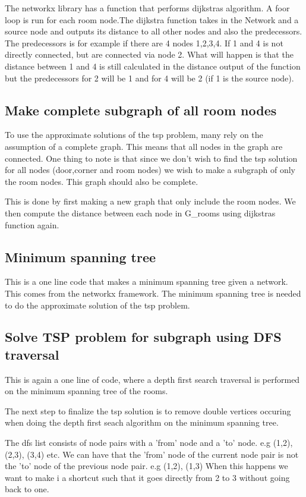 The networkx library has a function that performs dijkstras algorithm. A foor loop is run for each room node.The dijkstra function takes in the Network and a source node and outputs its distance to all other nodes and also the predecessors. The predecessors is for example if there are 4 nodes 1,2,3,4. If 1 and 4 is not directly connected, but are connected via node 2. What will happen is that the distance between 1 and 4 is still calculated in the distance output of the function but the predecessors for 2 will be 1 and for 4 will be 2 (if 1 is the source node).


\subsection{Make complete subgraph of all room nodes}
To use the approximate solutions of the tsp problem, many rely on the assumption of a complete graph. This means that all nodes in the graph are connected. One thing to note is that since we don't wish to find the tsp solution for all nodes (door,corner and room nodes) we wish to make a subgraph of only the room nodes. This graph should also be complete. 

This is done by first making a new graph that only include the room nodes.
We then compute the distance between each node in G_rooms using dijkstras function again.



\subsection{Minimum spanning tree}
This is a one line code that makes a minimum spanning tree given a network. This comes from the networkx framework. 
The minimum spanning tree is needed to do the approximate solution of the tsp problem.


\subsection{Solve TSP problem for subgraph using DFS traversal}
This is again a one line of code, where a depth first search traversal is performed on the minimum spanning tree of the rooms. 

The next step to finalize the tsp solution is to remove double vertices occuring when doing the depth first seach algorithm on the minimum spanning tree.

The dfs list consists of node pairs with a 'from' node and a 'to' node.
e.g
(1,2), (2,3), (3,4) etc.
We can have that the 'from' node of the current node pair is not the 'to' node of the previous node pair. 
e.g
(1,2), (1,3)
When this happens we want to make i a shortcut such that it goes directly from 2 to 3 without going back to one.



